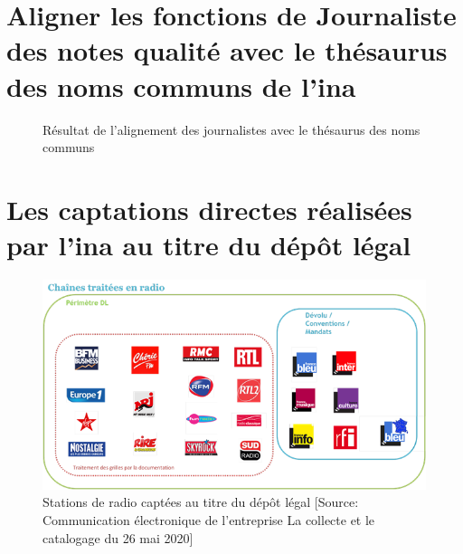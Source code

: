 \chapter{\label{annexe_alignement_journaliste}Aligner les fonctions de \og Journaliste\fg{} des notes qualité avec le thésaurus des noms communs de l'\ac{ina}}

\begin{figure}[!h]
	\centering
	\caption{Résultat de l'alignement des journalistes avec le thésaurus des noms communs}
	\label{alignement_journaliste}
\end{figure}

\chapter{\label{annexe_dl_captation}Les captations directes réalisées par l'\ac{ina} au titre du dépôt légal}

\begin{figure}[!h]
	\centering
	\includegraphics[width=16cm]{images/dl_radio.png}
	\caption[Stations de radio captées au titre du dépôt légal]{Stations de radio captées au titre du dépôt légal [Source: Communication électronique  de l'entreprise \og La collecte et le catalogage\fg{} du 26 mai 2020]}
	\label{dl_radio}
\end{figure}

